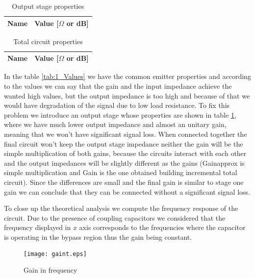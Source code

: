 \begin{table}[h]
  \centering
  \begin{tabular}{|l|r|}
    \hline    
    {\bf Name} & {\bf Value [{$\Omega$} or dB]} \\ \hline
    
  \end{tabular}
  \caption{Output stage properties}
  \label{tab:2_Values}
\end{table}

\begin{table}[h]
  \centering
  \begin{tabular}{|l|r|}
    \hline    
    {\bf Name} & {\bf Value [{$\Omega$} or dB]} \\ \hline
    
  \end{tabular}
  \caption{Total circuit properties}
  \label{tab:T_Values}
\end{table}


In the table \ref{tab:1_Values} we have the common emitter properties and according to the values we can say that the gain and the input impedance achieve the wanted high
values, but the output impedance is too high and because of that we would have degradation of the signal due to low load resistance. To fix this problem we introduce an 
output stage whose properties are shown in table \ref{tab:2_Values}, where we have much lower output impedance and almost an unitary gain, meaning that we won't have 
significant signal loss. When connected together the final circuit won't keep the output stage impedance neither the gain will be the simple multiplication of both gains,
because the circuits interact with each other and the output impedances will be slightly different as the gains (Gainapprox is simple multiplication and Gain is the one
obtained building incremental total circuit).
Since the differences are small and the final gain is similar to stage one gain we can conclude that they can be connected without a significant signal loss.

To close up the theoretical analysis we compute the frequency response of the circuit. Due to the presence of coupling capacitors we considered that the frequency displayed
in $x$ axis corresponds to the frequencies where the capacitor is operating in the bypass region thus the gain being constant.    


\begin{figure}[h] \centering
\texttt{[image: gaint.eps]}
\caption{Gain in frequency}
\label{fig:1}
\end{figure}


